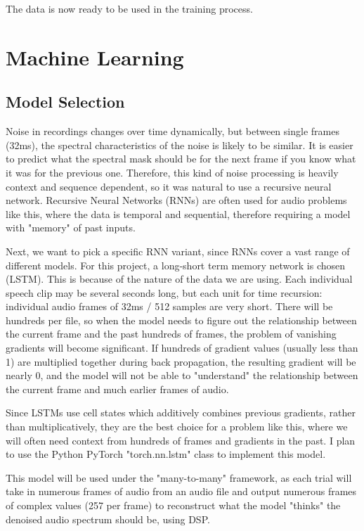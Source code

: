 \documentclass[11pt, letterpaper,titlepage]{article}
\begin{document}
The data is now ready to be used in the training process.


\section{Machine Learning}

\subsection{Model Selection}

Noise in recordings changes over time dynamically, but between single frames (32ms), the spectral characteristics of the noise is likely to be similar. It is easier to predict what the spectral mask should be for the next frame if you know what it was for the previous one. Therefore, this kind of noise processing is heavily context and sequence dependent, so it was natural to use a recursive neural network. Recursive Neural Networks (RNNs) are often used for audio problems like this, where the data is temporal and sequential, therefore requiring a model with "memory" of past inputs.

Next, we want to pick a specific RNN variant, since RNNs cover a vast range of different models. For this project, a long-short term memory network is chosen (LSTM). This is because of the nature of the data we are using. Each individual speech clip may be several seconds long, but each unit for time recursion: individual audio frames of 32ms / 512 samples are very short. There will be hundreds per file, so when the model needs to figure out the relationship between the current frame and the past hundreds of frames, the problem of vanishing gradients will become significant. If hundreds of gradient values (usually less than 1) are multiplied together during back propagation, the resulting gradient will be nearly 0, and the model will not be able to "understand" the relationship between the current frame and much earlier frames of audio.

Since LSTMs use cell states which additively combines previous gradients, rather than multiplicatively, they are the best choice for a problem like this, where we will often need context from hundreds of frames and gradients in the past. I plan to use the Python PyTorch "torch.nn.lstm" class to implement this model.

This model will be used under the "many-to-many" framework, as each trial will take in numerous frames of audio from an audio file and output numerous frames of complex values (257 per frame) to reconstruct what the model "thinks" the denoised audio spectrum should be, using DSP.
\end{document}

